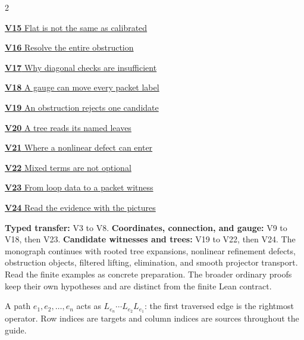 \documentclass[11pt,letterpaper]{article}
\begin{document}
\begin{multicols}{2}
{\small\noindent\hyperlink{vpage15}{\textbf{V15} Flat is not the same as calibrated}\par\smallskip}
{\small\noindent\hyperlink{vpage16}{\textbf{V16} Resolve the entire obstruction}\par\smallskip}
{\small\noindent\hyperlink{vpage17}{\textbf{V17} Why diagonal checks are insufficient}\par\smallskip}
{\small\noindent\hyperlink{vpage18}{\textbf{V18} A gauge can move every packet label}\par\smallskip}
{\small\noindent\hyperlink{vpage19}{\textbf{V19} An obstruction rejects one candidate}\par\smallskip}
{\small\noindent\hyperlink{vpage20}{\textbf{V20} A tree reads its named leaves}\par\smallskip}
{\small\noindent\hyperlink{vpage21}{\textbf{V21} Where a nonlinear defect can enter}\par\smallskip}
{\small\noindent\hyperlink{vpage22}{\textbf{V22} Mixed terms are not optional}\par\smallskip}
{\small\noindent\hyperlink{vpage23}{\textbf{V23} From loop data to a packet witness}\par\smallskip}
{\small\noindent\hyperlink{vpage24}{\textbf{V24} Read the evidence with the pictures}\par\smallskip}

\end{multicols}
\medskip
{}
\textbf{Typed transfer:} V3 to V8.
\textbf{Coordinates, connection, and gauge:} V9 to V18, then V23.
\textbf{Candidate witnesses and trees:} V19 to V22, then V24.
The monograph continues with rooted tree expansions, nonlinear
refinement defects, obstruction objects, filtered lifting, elimination, and
smooth projector transport. Read the finite examples as concrete preparation.
The broader ordinary proofs keep their own hypotheses and are distinct from
the finite Lean contract.

A path $e_1,e_2,\ldots,e_n$ acts as $L_{e_n}\cdots L_{e_2}L_{e_1}$:
the first traversed edge is the rightmost operator. Row indices are targets
and column indices are sources throughout the guide.
\clearpage
{}
\begingroup
{}\fontsize{10}{12}\selectfont
\setlength{\parskip}{3pt}\setlength{\abovedisplayskip}{6pt}\setlength{\belowdisplayskip}{6pt}

\endgroup
\end{document}
